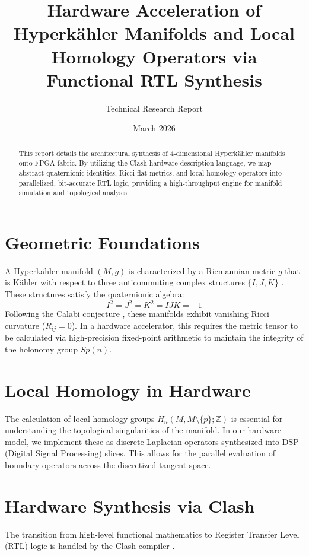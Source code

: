 \documentclass[12pt, a4paper]{article}
\title{Hardware Acceleration of Hyperk\"ahler Manifolds and Local Homology Operators via Functional RTL Synthesis}
\author{Technical Research Report}
\date{March 2026}
\begin{document}
\maketitle

\begin{abstract}
This report details the architectural synthesis of 4-dimensional Hyperk\"ahler manifolds onto FPGA fabric. By utilizing the Clash hardware description language, we map abstract quaternionic identities, Ricci-flat metrics, and local homology operators into parallelized, bit-accurate RTL logic, providing a high-throughput engine for manifold simulation and topological analysis.
\end{abstract}

\section{Geometric Foundations}
A Hyperk\"ahler manifold $(M, g)$ is characterized by a Riemannian metric $g$ that is K\"ahler with respect to three anticommuting complex structures $\{I, J, K\}$ \cite{beauville1983varietes}. These structures satisfy the quaternionic algebra:
\begin{equation}
    I^2 = J^2 = K^2 = IJK = -1
\end{equation}
Following the Calabi conjecture \cite{calabi1957algebraic}, these manifolds exhibit vanishing Ricci curvature ($R_{ij} = 0$). In a hardware accelerator, this requires the metric tensor to be calculated via high-precision fixed-point arithmetic to maintain the integrity of the holonomy group $Sp(n)$.

\section{Local Homology in Hardware}
The calculation of local homology groups $H_n(M, M \setminus \{p\}; \mathbb{Z})$ is essential for understanding the topological singularities of the manifold. In our hardware model, we implement these as discrete Laplacian operators synthesized into DSP (Digital Signal Processing) slices. This allows for the parallel evaluation of boundary operators across the discretized tangent space.

\section{Hardware Synthesis via Clash}
The transition from high-level functional mathematics to Register Transfer Level (RTL) logic is handled by the Clash compiler \cite{clash2010}.
\end{document}
